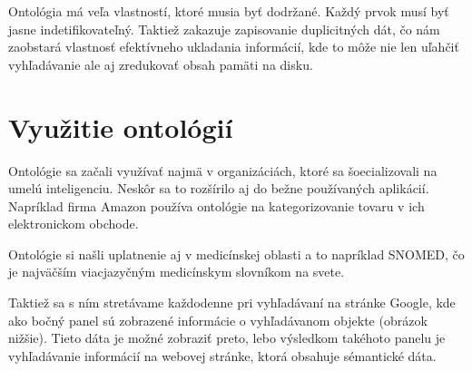 \documentclass[12pt, a4paper, oneside]{book}
\begin{document}
Ontológia má veľa vlastností, ktoré musia byť dodržané. Každý prvok musí byť jasne indetifikovateľný. Taktiež zakazuje zapisovanie duplicitných dát, čo nám zaobstará vlastnosť efektívneho ukladania informácií, kde to môže nie len uľahčiť vyhľadávanie ale aj zredukovať obsah pamäti na disku. 


\section{Využitie ontológií}

Ontológie sa začali využívať najmä v organizáciách, ktoré sa šoecializovali na umelú inteligenciu. Neskôr sa to rozšírilo aj do bežne používaných aplikácií. Napríklad firma Amazon používa ontológie na kategorizovanie tovaru v ich elektronickom obchode.


Ontológie si našli uplatnenie aj v medicínskej oblasti a to napríklad SNOMED, čo je najväčším viacjazyčným medicínskym slovníkom na svete. 



Taktiež sa s ním stretávame každodenne pri vyhľadávaní na stránke Google, kde ako bočný panel sú zobrazené informácie o vyhľadávanom objekte (obrázok nižšie). Tieto dáta je možné zobraziť preto, lebo výsledkom takéhoto panelu je vyhľadávanie informácií na webovej stránke, ktorá obsahuje sémantické dáta.
\end{document}
